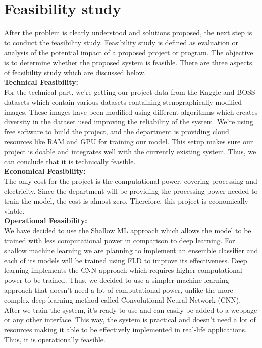 \chapter{Feasibility study}
After the problem is clearly understood and solutions proposed, the next step is to conduct the
feasibility study. Feasibility study is defined as evaluation or analysis of the potential impact
of a proposed project or program. The objective is to determine whether the proposed system
is feasible. There are three aspects of feasibility study which are discussed below.\\
\textbf{Technical Feasibility:}\\For the technical part, we're getting our project data from the Kaggle and BOSS datasets which contain various datasets containing stenographically modified images. These images have been modified using different algorithms which creates diversity in the dataset used improving the reliability of the system. We're using free software to build the project, and the department is providing cloud resources like RAM and GPU for training our model. This setup makes sure our project is doable and integrates well with the currently existing system. Thus, we can conclude that it is technically feasible.\\
\textbf{Economical Feasibility:}\\The only cost for the project is the computational power, covering processing and electricity. Since the department will be providing the processing power needed to train the model, the cost is almost zero. Therefore, this project is economically viable.\\
\textbf{Operational Feasibility:}\\We have decided to use the Shallow ML approach which allows the model to be trained with less computational power in comparison to deep learning. For shallow machine learning we are planning to implement an ensemble classifier and each of its models will be trained using FLD to improve its effectiveness. Deep learning implements the CNN approach which requires higher computational power to be trained. Thus, we decided to use a simpler machine learning approach that doesn't need a lot of computational power, unlike the more complex deep learning method called Convolutional Neural Network (CNN). After we train the system, it's ready to use and can easily be added to a webpage or any other interface. This way, the system is practical and doesn't need a lot of resources making it able to be effectively implemented in real-life applications. Thus, it is operationally feasible.
\\